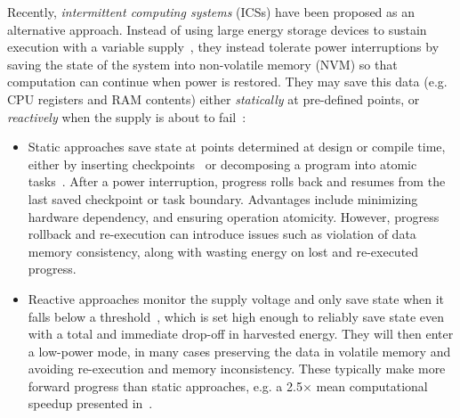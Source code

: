 Recently, \textit{intermittent computing systems} (ICSs) have been proposed as an alternative approach. Instead of using large energy storage devices to sustain execution with a variable supply~\cite{Ransford:2011:MSS:1950365.1950386, 6733152, 6960060, Lucia:2015:SSP:2737924.2737978, 6341281, 199319}, they instead tolerate power interruptions by saving the state of the system into non-volatile memory (NVM) so that computation can continue when power is restored. They may save this data (e.g. CPU registers and RAM contents) either \textit{statically} at pre-defined points, or \textit{reactively} when the supply is about to fail~\cite{Sliper:2019:ESR:3316781.3317812, doi:10.1098/rsta.2019.0158}:

\begin{itemize}
	\item Static approaches save state at points determined at design or compile time, either by inserting checkpoints~\cite{Ransford:2011:MSS:1950365.1950386, 7944791, 222579} or decomposing a program into atomic tasks~\cite{10.1145/3022671.2983995, Maeng:2017:AIE:3152284.3133920}. After a power interruption, progress rolls back and resumes from the last saved checkpoint or task boundary. Advantages include minimizing hardware dependency, and ensuring operation atomicity. However, progress rollback and re-execution can introduce issues such as violation of data memory consistency, along with wasting energy on lost and re-executed progress.
	\item Reactive approaches monitor the supply voltage and only save state when it falls below a threshold~\cite{6733152, 6960060}, which is set high enough to reliably save state even with a total and immediate drop-off in harvested energy. They will then enter a low-power mode, in many cases preserving the data in volatile memory and avoiding re-execution and memory inconsistency. These typically make more forward progress than static approaches, e.g. a 2.5$\times$ mean computational speedup presented in~\cite{Maeng:2019:SPI:3314221.3314613}. 
	
\end{itemize}


